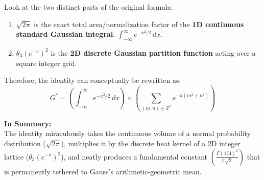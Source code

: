 \documentclass[12pt]{article}
\begin{document}
Look at the two distinct parts of the original formula:
\begin{enumerate}
    \item $\sqrt{2\pi}$ is the exact total area/normalization factor of the \textbf{1D continuous standard Gaussian integral}: $\int_{-\infty}^\infty e^{-x^2/2} \, dx$.
    \item $\theta_3(e^{-\pi})^2$ is the \textbf{2D discrete Gaussian partition function} acting over a square integer grid.
\end{enumerate}

Therefore, the identity can conceptually be rewritten as:
\begin{equation}
    G^* = \left( \int_{-\infty}^\infty e^{-x^2/2} \, dx \right) \times \left( \sum_{(m,n) \in \mathbb{Z}^2} e^{-\pi(m^2+n^2)} \right)
\end{equation}

\vspace{0.5cm}
\noindent \textbf{In Summary:} \\
The identity miraculously takes the continuous volume of a normal probability distribution ($\sqrt{2\pi}$), multiplies it by the discrete heat kernel of a 2D integer lattice ($\theta_3(e^{-\pi})^2$), and neatly produces a fundamental constant $\left(\frac{\Gamma(1/4)^2}{\pi\sqrt{2}}\right)$ that is permanently tethered to Gauss's arithmetic-geometric mean.
\end{document}
